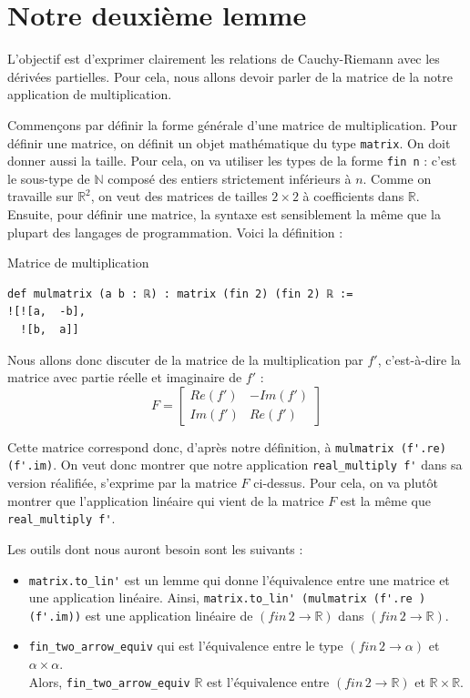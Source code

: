 \documentclass[a4paper, 11pt, twoside]{report}
\newcommand\R{\mathbb{R}}
\begin{document}
\section{Notre deuxième lemme}

L'objectif est d'exprimer clairement les relations de Cauchy-Riemann avec les dérivées partielles. Pour cela, nous allons devoir parler de la matrice de la notre application de multiplication. 

\medskip

Commençons par définir la forme générale d'une matrice de multiplication.
Pour définir une matrice, on définit un objet mathématique du type \verb|matrix|. On doit donner aussi la taille. Pour cela, on va utiliser les types de la forme \verb|fin n| : c'est le sous-type de $\mathbb{N}$ composé des entiers strictement inférieurs à $n$. Comme on travaille sur $\R^2$, on veut des matrices de tailles $2\times 2$ à coefficients dans $\R$. Ensuite, pour définir une matrice, la syntaxe est sensiblement la même que la plupart des langages de programmation. Voici la définition :

\begin{code}{Matrice de multiplication}
\begin{lstlisting}
def mulmatrix (a b : ℝ) : matrix (fin 2) (fin 2) ℝ :=
![![a,  -b],
  ![b,  a]]
\end{lstlisting}
\end{code}

Nous allons donc discuter de la matrice de la multiplication par $f'$, c'est-à-dire la matrice avec partie réelle et imaginaire de $f'$ :
\[F = \begin{bmatrix}
Re(f') & -Im(f') \\ Im(f') & Re(f')
\end{bmatrix}\]

Cette matrice correspond donc, d'après notre définition, à \verb|mulmatrix (f'.re) (f'.im)|. On veut donc montrer que notre application \verb|real_multiply f'| dans sa version réalifiée, s'exprime par la matrice $F$ ci-dessus. Pour cela, on va plutôt montrer que l'application linéaire qui vient de la matrice $F$ est la même que \verb|real_multiply f'|.

\medskip

Les outils dont nous auront besoin sont les suivants :
\begin{itemize}
	\item \verb|matrix.to_lin'| est un lemme qui donne l'équivalence entre une matrice et une application linéaire. Ainsi, \verb|matrix.to_lin' (mulmatrix (f'.re ) (f'.im))| est une application linéaire de $(fin\, 2\rightarrow \R)$ dans $(fin\, 2\rightarrow \R)$.
	\item \verb|fin_two_arrow_equiv| qui est l'équivalence entre le type $(fin\, 2\to \alpha)$ et $\alpha\times\alpha$. \\
	Alors, \verb|fin_two_arrow_equiv| $\R$ est l'équivalence entre $(fin\,2\to\R)$ et $\R\times \R$.
\end{itemize}
\end{document}
